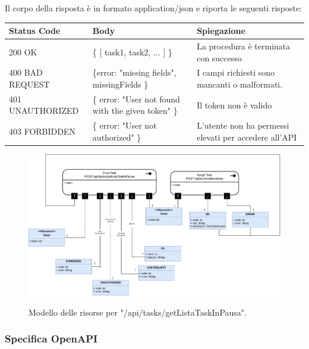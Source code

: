 \documentclass{report}
\begin{document}
Il corpo della risposta è in formato application/json e riporta le seguenti risposte:

\begin{center} %
	\centering
	\begin{tabular}{ |p{4cm}|p{4cm}|p{4cm}| }
		\hline
		\centering Status Code & \qquad\qquad\quad Body                             & \qquad\quad Spiegazione                               \\ %
		\hline
		200 OK                 & \{ [ task1, task2, ... ] \}                        & La procedura è terminata con successo                 \\
		\hline
		400 BAD REQUEST        & \{error: "missing fields", missingFields \}        & I campi richiesti sono mancanti o malformati.         \\
		\hline
		401 UNAUTHORIZED       & \{ error: "User not found with the given token" \} & Il token non è valido                                 \\
		\hline
		403 FORBIDDEN          & \{ error: "User not authorized" \}                 & L'utente non ha permessi elevati per accedere all'API \\
		\hline
	\end{tabular}
\end{center}

\begin{figure}[H]
	\centering\includegraphics[width=1\textwidth]{images/model_in_pausa.png}

	Modello delle risorse per "/api/tasks/getListaTaskInPausa".
\end{figure}

\subsubsection*{Specifica OpenAPI}
\end{document}
